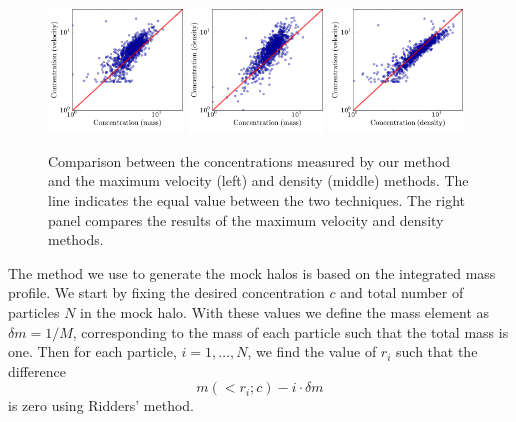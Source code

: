 \documentclass[a4,useAMS,usenatbib,usegraphicx]{mn2e}
\begin{document}
\label{sec:data}
\begin{figure}
  \begin{center}
    \includegraphics[width=0.32\textwidth]{conc_mass_vel.pdf}
    \includegraphics[width=0.32\textwidth]{conc_mass_dens.pdf}
    \includegraphics[width=0.32\textwidth]{conc_dens_vel.pdf}
  \end{center}
  \caption{Comparison between the concentrations measured by our
    method and the maximum velocity (left) and density (middle)
    methods. The line indicates the equal value between the two
    techniques. The right panel compares the results of the maximum
    velocity and density methods.
  \label{fig:mdv}}
\end{figure}



The method we use to generate the mock halos is based on the
integrated mass profile.  
We start by fixing the desired concentration $c$ and total number of
particles $N$ in the mock halo.  
With these values we define the mass element as $\delta m = 1/M$, corresponding
to the mass of each particle such that the total mass is one.   
Then for each particle, $i=1,\ldots,N$, we find the value of $r_i$
such that the difference 
% 
\begin{equation}
m(<r_i;c) - i \cdot \delta m
\end{equation}
%
is zero using Ridders' method.
\end{document}
